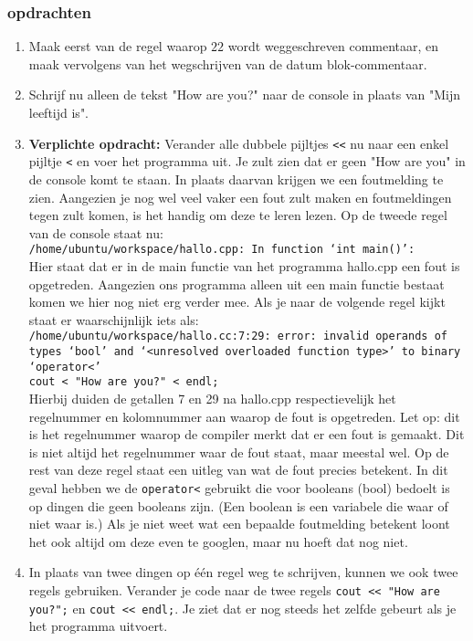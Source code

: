 \documentclass[12pt,a4paper]{article}
\newcommand{\icode}{\lstinline}
\newcommand{\mono}{\texttt}
\begin{document}
\subsubsection{opdrachten}
\begin{enumerate}
		\item
			Maak eerst van de regel waarop $22$ wordt weggeschreven commentaar, en maak vervolgens van het wegschrijven van de datum blok-commentaar.
		\item
			Schrijf nu alleen de tekst "How are you?" naar de console in plaats van "Mijn leeftijd is".
		\item 
			\textbf{Verplichte opdracht:} Verander alle dubbele pijltjes \icode{<<} nu naar een enkel pijltje \icode{<} en voer het programma uit. Je zult zien dat er geen "How are you" in de console komt te staan. In plaats daarvan krijgen we een foutmelding te zien. Aangezien je nog wel veel vaker een fout zult maken en foutmeldingen tegen zult komen, is het handig om deze te leren lezen. Op de tweede regel van de console staat nu:\\
\mono{/home/ubuntu/workspace/hallo.cpp: In function ‘int main()’:}\\
Hier staat dat er in de main functie van het programma hallo.cpp een fout is opgetreden. Aangezien ons programma alleen uit een main functie bestaat komen we hier nog niet erg verder mee. Als je naar de volgende regel kijkt staat er waarschijnlijk iets als:\\
\mono{/home/ubuntu/workspace/hallo.cc:7:29: error: invalid operands of types ‘bool’ and ‘<unresolved overloaded function type>’ to binary ‘operator<'\\
cout < "How are you?" < endl;}\\
Hierbij duiden de getallen 7 en 29 na hallo.cpp respectievelijk het regelnummer en kolomnummer aan waarop de fout is opgetreden. Let op: dit is het regelnummer waarop de compiler merkt dat er een fout is gemaakt. Dit is niet altijd het regelnummer waar de fout staat, maar meestal wel. Op de rest van deze regel staat een uitleg van wat de fout precies betekent. In dit geval hebben we de \mono{operator<} gebruikt die voor booleans (bool) bedoelt is op dingen die geen booleans zijn. (Een boolean is een variabele die waar of niet waar is.) Als je niet weet wat een bepaalde foutmelding betekent loont het ook altijd om deze even te googlen, maar nu hoeft dat nog niet.
		\item
			In plaats van twee dingen op \'e\'en regel weg te schrijven, kunnen we ook twee regels gebruiken. Verander je code naar de twee regels \icode{cout << "How are you?";} en \icode{cout << endl;}. Je ziet dat er nog steeds het zelfde gebeurt als je het programma uitvoert.

\end{enumerate}
\end{document}
